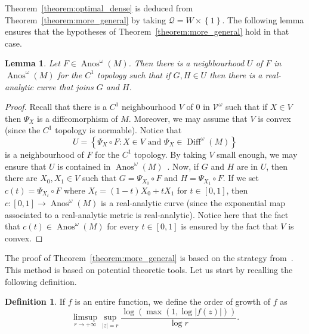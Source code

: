 \documentclass[10pt]{amsart}
\newtheorem{lemm}[theo]{Lemma}\newtheorem{prop}[theo]{Proposition}\newtheorem{coro}[theo]{Corollary}\newtheorem{conj}[theo]{Conjecture}
\theoremstyle{definition}\newtheorem{defi}[theo]{Definition}\newtheorem{rema}[theo]{Remark}\newtheorem{exam}[theo]{Example}\newtheorem{exem}[theo]{Example}\newtheorem{nota}[theo]{Notation}
\DeclareMathOperator{\Diff}{Diff}
\DeclareMathOperator{\Anos}{Anos}
\newcommand{\set}[1]{\left\{ #1 \right\}}
\newcommand{\va}[1]{\left|#1\right|}
\newcommand{\clV}{\mathcal{V}}
\newcommand{\clQ}{\mathcal{Q}}
\begin{document}
Theorem~\ref{theorem:optimal_dense} is deduced from Theorem~\ref{theorem:more_general} by taking $\clQ = W \times \set{1}$. The following lemma ensures that the hypotheses of Theorem~\ref{theorem:more_general} hold in that case.

\begin{lemm}
Let $F \in \Anos^\omega(M)$. Then there is a neighbourhood $U$ of $F$ in $\Anos^\omega(M)$ for the $C^1$ topology such that if $G,H \in U$ then there is a real-analytic curve that joins $G$ and $H$.
\end{lemm}

\begin{proof}
Recall that there is a $C^1$ neighbourhood $V$ of $0$ in $\clV^\omega$ such that if $X \in V$ then $\Psi_X$ is a diffeomorphism of $M$. Moreover, we may assume that $V$ is convex (since the $C^1$ topology is normable). Notice that
\begin{equation*}
U = \set{ \Psi_X \circ F : X \in V \text{ and } \Psi_X \in \Diff^\omega(M)}
\end{equation*}
is a neighbourhood of $F$ for the $C^1$ topology. By taking $V$ small enough, we may ensure that $U$ is contained in $\Anos^\omega(M)$~\cite{original_anosov}. Now, if $G$ and $H$ are in $U$, then there are $X_0,X_1 \in V$ such that $G = \Psi_{X_0} \circ F$ and $H = \Psi_{X_1} \circ F$. If we set $c(t) = \Psi_{X_t} \circ F$ where $X_t = (1-t)X_0 + t X_1$ for $t \in [0,1]$, then $c: [0,1] \to \Anos^\omega(M)$ is a real-analytic curve (since the exponential map associated to a real-analytic metric is real-analytic). Notice here that the fact that $c(t) \in \Anos^\omega(M)$ for every $t \in [0,1]$ is ensured by the fact that $V$ is convex.
\end{proof}

The proof of Theorem~\ref{theorem:more_general} is based on the strategy from~\cite{christiansen_hyperbolic,bandtlow_naud,
christiansen_schrodinger,christiansen_potential,
christiansen_several,
christiansen_euclidean}. This method is based on potential theoretic tools. Let us start by recalling the following definition.

\begin{defi}
If $f$ is an entire function, we define the order of growth of $f$ as
\begin{equation*}
\limsup_{r \to + \infty} \sup_{\va{z} = r} \frac{\log(\max(1, \log \va{f(z)}))}{\log r}.
\end{equation*}
\end{defi}
\end{document}
